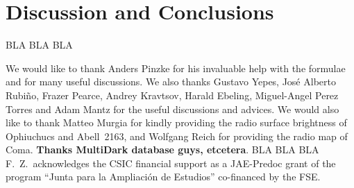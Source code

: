 \documentclass[traditabstract]{aa}
\begin{document}
\section{Discussion and Conclusions}
\label{sec:6}
BLA BLA BLA\\


\begin{acknowledgements}
We would like to thank Anders Pinzke for his invaluable help with the formulae and for many useful discussions. We also thanks Gustavo Yepes, Jos\'e Alberto Rubi\~no, Frazer Pearce, Andrey Kravtsov, Harald Ebeling, Miguel-Angel Perez Torres and Adam Mantz for the useful discussions and advices. We would also like to thank Matteo Murgia for kindly providing the radio surface brightness of Ophiuchucs and Abell~2163, and Wolfgang Reich for providing the radio map of Coma. {\bf Thanks MultiDark database guys, etcetera}.
BLA BLA BLA\\ 
F.~Z.~acknowledges the CSIC financial support as a JAE-Predoc grant of the program ``Junta para la Ampliaci\'on de Estudios'' co-financed by the FSE.
\end{acknowledgements}
\end{document}

